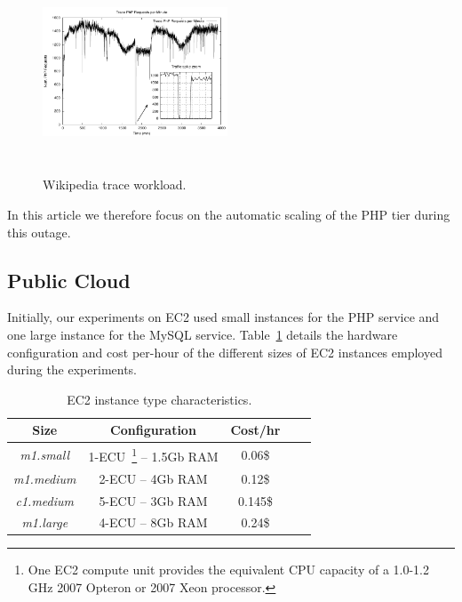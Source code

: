 \begin{figure}
\begin{center}
\includegraphics[width=0.49\textwidth, height=6cm]{./images/traceWorkload_zoom}
\end{center}
\vspace{-5mm}
\caption{Wikipedia trace workload.}
\label{workload}
\end{figure}


In this article we therefore focus on the automatic scaling of the PHP tier during this outage.



\subsection{Public Cloud}

Initially, our experiments on EC2 used small instances for the PHP service and one large instance for the MySQL service. Table~\ref{EC2instances} details the hardware configuration and cost per-hour of the different sizes of EC2 instances employed during the experiments.

\begin{table}
  {\scriptsize 
\begin{center}
    \begin{tabular}{  | c | c | c | c | c |}
    \hline
      \textbf{Size}  & \textbf{Configuration} & \textbf{Cost/hr} \\ \hline
   \textit{m1.small}   & 1-ECU~\footnote{One EC2 compute unit provides the equivalent CPU capacity of a 1.0-1.2 GHz 2007 Opteron or 2007 Xeon processor.}  -- 1.5Gb RAM&  0.06\$ \\ \hline
   \textit{m1.medium}   & 2-ECU -- 4Gb RAM&  0.12\$ \\ \hline
\textit{c1.medium} & 5-ECU -- 3Gb RAM& 0.145\$   \\ \hline
\textit{m1.large} & 4-ECU -- 8Gb RAM& 0.24\$   \\ \hline
 \end{tabular}
\end{center}
\vspace{-5mm}
\caption{EC2 instance type characteristics.}
\label{EC2instances}
}
\end{table}


